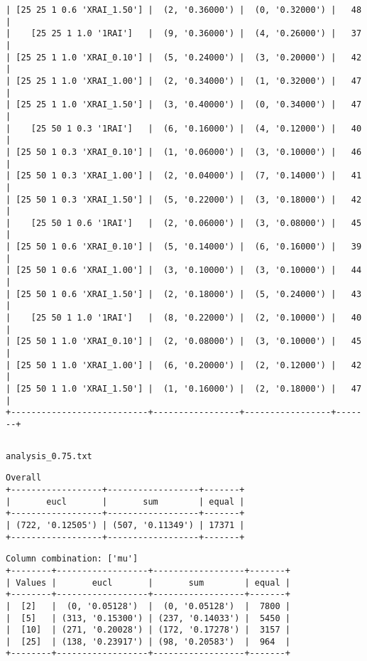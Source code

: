 \documentclass{article}
\begin{document}
\begin{verbatim}
| [25 25 1 0.6 'XRAI_1.50'] |  (2, '0.36000') |  (0, '0.32000') |   48  |
|    [25 25 1 1.0 '1RAI']   |  (9, '0.36000') |  (4, '0.26000') |   37  |
| [25 25 1 1.0 'XRAI_0.10'] |  (5, '0.24000') |  (3, '0.20000') |   42  |
| [25 25 1 1.0 'XRAI_1.00'] |  (2, '0.34000') |  (1, '0.32000') |   47  |
| [25 25 1 1.0 'XRAI_1.50'] |  (3, '0.40000') |  (0, '0.34000') |   47  |
|    [25 50 1 0.3 '1RAI']   |  (6, '0.16000') |  (4, '0.12000') |   40  |
| [25 50 1 0.3 'XRAI_0.10'] |  (1, '0.06000') |  (3, '0.10000') |   46  |
| [25 50 1 0.3 'XRAI_1.00'] |  (2, '0.04000') |  (7, '0.14000') |   41  |
| [25 50 1 0.3 'XRAI_1.50'] |  (5, '0.22000') |  (3, '0.18000') |   42  |
|    [25 50 1 0.6 '1RAI']   |  (2, '0.06000') |  (3, '0.08000') |   45  |
| [25 50 1 0.6 'XRAI_0.10'] |  (5, '0.14000') |  (6, '0.16000') |   39  |
| [25 50 1 0.6 'XRAI_1.00'] |  (3, '0.10000') |  (3, '0.10000') |   44  |
| [25 50 1 0.6 'XRAI_1.50'] |  (2, '0.18000') |  (5, '0.24000') |   43  |
|    [25 50 1 1.0 '1RAI']   |  (8, '0.22000') |  (2, '0.10000') |   40  |
| [25 50 1 1.0 'XRAI_0.10'] |  (2, '0.08000') |  (3, '0.10000') |   45  |
| [25 50 1 1.0 'XRAI_1.00'] |  (6, '0.20000') |  (2, '0.12000') |   42  |
| [25 50 1 1.0 'XRAI_1.50'] |  (1, '0.16000') |  (2, '0.18000') |   47  |
+---------------------------+-----------------+-----------------+-------+
\end{verbatim}

\begin{verbatim}

\end{verbatim}

\newpage
\verb|analysis_0.75.txt|
\begin{verbatim}
Overall
+------------------+------------------+-------+
|       eucl       |       sum        | equal |
+------------------+------------------+-------+
| (722, '0.12505') | (507, '0.11349') | 17371 |
+------------------+------------------+-------+
\end{verbatim}

\begin{verbatim}
Column combination: ['mu']
+--------+------------------+------------------+-------+
| Values |       eucl       |       sum        | equal |
+--------+------------------+------------------+-------+
|  [2]   |  (0, '0.05128')  |  (0, '0.05128')  |  7800 |
|  [5]   | (313, '0.15300') | (237, '0.14033') |  5450 |
|  [10]  | (271, '0.20028') | (172, '0.17278') |  3157 |
|  [25]  | (138, '0.23917') | (98, '0.20583')  |  964  |
+--------+------------------+------------------+-------+
\end{verbatim}
\end{document}
